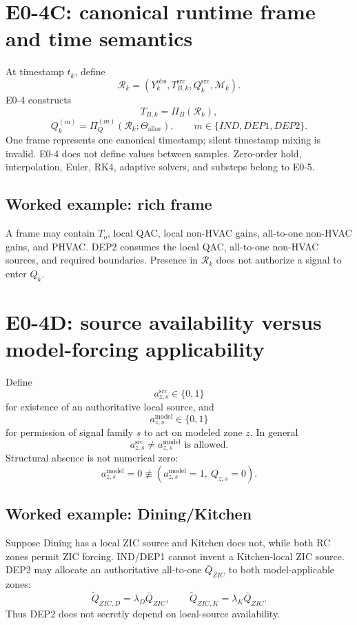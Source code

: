 \documentclass[11pt]{article}
\begin{document}
\section{E0-4C: canonical runtime frame and time semantics}
At timestamp \(t_k\), define
\[
\boxed{\mathcal R_k=(Y_k^{\mathrm{obs}},T_{B,k}^{\mathrm{src}},Q_k^{\mathrm{src}},\mathcal M_k)}.
\]
E0-4 constructs
\[
\boxed{T_{B,k}=\Pi_B(\mathcal R_k)},
\]
\[
\boxed{Q_k^{(m)}=\Pi_Q^{(m)}(\mathcal R_k;\Theta_{\mathrm{alloc}})},\qquad
m\in\{IND,DEP1,DEP2\}.
\]
One frame represents one canonical timestamp; silent timestamp mixing is invalid.
E0-4 does not define values between samples. Zero-order hold, interpolation, Euler, RK4,
adaptive solvers, and substeps belong to E0-5.

\subsection*{Worked example: rich frame}
A frame may contain \(T_o\), local QAC, local non-HVAC gains, all-to-one non-HVAC gains,
and PHVAC. DEP2 consumes the local QAC, all-to-one non-HVAC sources, and required
boundaries. Presence in \(\mathcal R_k\) does not authorize a signal to enter \(Q_k\).

\section{E0-4D: source availability versus model-forcing applicability}
Define
\[
\boxed{a_{z,s}^{\mathrm{src}}\in\{0,1\}}
\]
for existence of an authoritative local source, and
\[
\boxed{a_{z,s}^{\mathrm{model}}\in\{0,1\}}
\]
for permission of signal family \(s\) to act on modeled zone \(z\). In general
\[
\boxed{a_{z,s}^{\mathrm{src}}\neq a_{z,s}^{\mathrm{model}}\text{ is allowed}}.
\]
Structural absence is not numerical zero:
\[
\boxed{a_{z,s}^{\mathrm{model}}=0\not\equiv(a_{z,s}^{\mathrm{model}}=1,\ Q_{z,s}=0)}.
\]

\subsection*{Worked example: Dining/Kitchen}
Suppose Dining has a local ZIC source and Kitchen does not, while both RC zones permit ZIC
forcing. IND/DEP1 cannot invent a Kitchen-local ZIC source. DEP2 may allocate an authoritative
all-to-one \(\bar Q_{ZIC}\) to both model-applicable zones:
\[
\widetilde Q_{ZIC,D}=\lambda_D\bar Q_{ZIC},\qquad
\widetilde Q_{ZIC,K}=\lambda_K\bar Q_{ZIC}.
\]
Thus DEP2 does not secretly depend on local-source availability.
\end{document}
